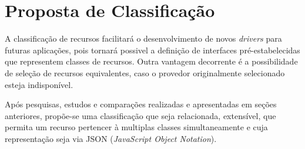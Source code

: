\chapter{Proposta de Classificação}
A classificação de recursos facilitará o desenvolvimento de novos \emph{drivers} para futuras aplicações, pois tornará possivel a definição de interfaces pré-estabelecidas que representem classes de recursos. Outra vantagem decorrente é a possibilidade de seleção de recursos equivalentes, caso o provedor originalmente selecionado esteja indisponível.

Após pesquisas, estudos e comparações realizadas e apresentadas em seções anteriores, propõe-se uma classificação que seja relacionada, extensível, que permita um recurso pertencer à multiplas classes simultaneamente e cuja representação seja via JSON (\emph{JavaScript Object Notation}).

